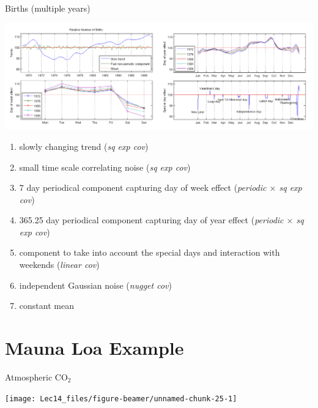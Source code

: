 \documentclass[11pt,ignorenonframetext,]{beamer}
\begin{document}
\begin{frame}{Births (multiple years)}
\protect\hypertarget{births-multiple-years}{}

\begin{adjustwidth}{-10mm}{-10mm}
\begin{center}
\includegraphics[width=\paperwidth]{figs/births_pic2.png}
\end{center}
\end{adjustwidth}

\vspace{-3mm}

\footnotesize

\begin{enumerate}
\item
  slowly changing trend (\emph{sq exp cov})
\item
  small time scale correlating noise (\emph{sq exp cov})
\item
  7 day periodical component capturing day of week effect
  (\emph{periodic \(\times\) sq exp cov})
\item
  365.25 day periodical component capturing day of year effect
  (\emph{periodic \(\times\) sq exp cov})
\item
  component to take into account the special days and interaction with
  weekends (\emph{linear cov})
\item
  independent Gaussian noise (\emph{nugget cov})
\item
  constant mean
\end{enumerate}

\end{frame}

\hypertarget{mauna-loa-example}{%
\section{Mauna Loa Example}\label{mauna-loa-example}}

\begin{frame}{Atmospheric CO\(_2\)}
\protect\hypertarget{atmospheric-co_2}{}

\begin{center}\texttt{[image: Lec14\_files/figure-beamer/unnamed-chunk-25-1]} \end{center}

\end{frame}
\end{document}
